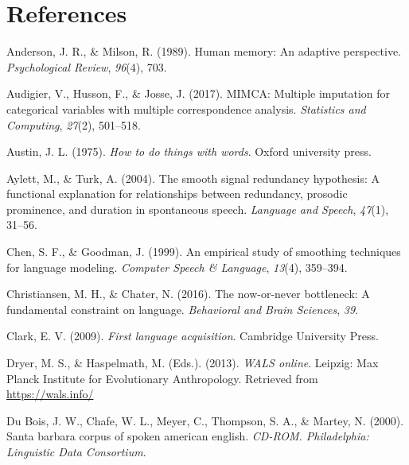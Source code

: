 \documentclass[man,floatsintext]{apa6}
\begin{document}
\newpage

\hypertarget{references}{%
\section{References}\label{references}}

\begingroup
\setlength{\parindent}{-0.5in}
\setlength{\leftskip}{0.5in}

\hypertarget{refs}{}
\leavevmode\hypertarget{ref-anderson1989}{}%
Anderson, J. R., \& Milson, R. (1989). Human memory: An adaptive perspective. \emph{Psychological Review}, \emph{96}(4), 703.

\leavevmode\hypertarget{ref-audigier2017}{}%
Audigier, V., Husson, F., \& Josse, J. (2017). MIMCA: Multiple imputation for categorical variables with multiple correspondence analysis. \emph{Statistics and Computing}, \emph{27}(2), 501--518.

\leavevmode\hypertarget{ref-austin1975}{}%
Austin, J. L. (1975). \emph{How to do things with words}. Oxford university press.

\leavevmode\hypertarget{ref-aylett2004}{}%
Aylett, M., \& Turk, A. (2004). The smooth signal redundancy hypothesis: A functional explanation for relationships between redundancy, prosodic prominence, and duration in spontaneous speech. \emph{Language and Speech}, \emph{47}(1), 31--56.

\leavevmode\hypertarget{ref-chen1999}{}%
Chen, S. F., \& Goodman, J. (1999). An empirical study of smoothing techniques for language modeling. \emph{Computer Speech \& Language}, \emph{13}(4), 359--394.

\leavevmode\hypertarget{ref-christiansen2016}{}%
Christiansen, M. H., \& Chater, N. (2016). The now-or-never bottleneck: A fundamental constraint on language. \emph{Behavioral and Brain Sciences}, \emph{39}.

\leavevmode\hypertarget{ref-clark2009}{}%
Clark, E. V. (2009). \emph{First language acquisition}. Cambridge University Press.

\leavevmode\hypertarget{ref-wals}{}%
Dryer, M. S., \& Haspelmath, M. (Eds.). (2013). \emph{WALS online}. Leipzig: Max Planck Institute for Evolutionary Anthropology. Retrieved from \url{https://wals.info/}

\leavevmode\hypertarget{ref-sbc}{}%
Du Bois, J. W., Chafe, W. L., Meyer, C., Thompson, S. A., \& Martey, N. (2000). Santa barbara corpus of spoken american english. \emph{CD-ROM. Philadelphia: Linguistic Data Consortium}.
\end{document}
